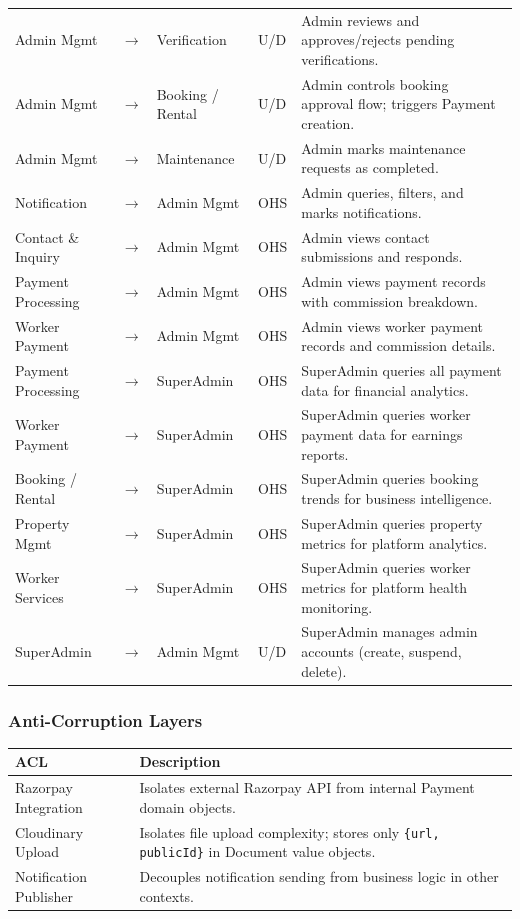 \documentclass[12pt,a4paper]{article}
\begin{document}
\begin{longtable}{@{}p{3.2cm}p{0.5cm}p{3.2cm}p{2.2cm}p{5.2cm}@{}}
Admin Mgmt & $\rightarrow$ & Verification & U/D & Admin reviews and approves/rejects pending verifications. \\[3pt]
Admin Mgmt & $\rightarrow$ & Booking / Rental & U/D & Admin controls booking approval flow; triggers Payment creation. \\[3pt]
Admin Mgmt & $\rightarrow$ & Maintenance & U/D & Admin marks maintenance requests as completed. \\[3pt]
Notification & $\rightarrow$ & Admin Mgmt & OHS & Admin queries, filters, and marks notifications. \\[3pt]
Contact \& Inquiry & $\rightarrow$ & Admin Mgmt & OHS & Admin views contact submissions and responds. \\[3pt]
Payment Processing & $\rightarrow$ & Admin Mgmt & OHS & Admin views payment records with commission breakdown. \\[3pt]
Worker Payment & $\rightarrow$ & Admin Mgmt & OHS & Admin views worker payment records and commission details. \\[3pt]
Payment Processing & $\rightarrow$ & SuperAdmin & OHS & SuperAdmin queries all payment data for financial analytics. \\[3pt]
Worker Payment & $\rightarrow$ & SuperAdmin & OHS & SuperAdmin queries worker payment data for earnings reports. \\[3pt]
Booking / Rental & $\rightarrow$ & SuperAdmin & OHS & SuperAdmin queries booking trends for business intelligence. \\[3pt]
Property Mgmt & $\rightarrow$ & SuperAdmin & OHS & SuperAdmin queries property metrics for platform analytics. \\[3pt]
Worker Services & $\rightarrow$ & SuperAdmin & OHS & SuperAdmin queries worker metrics for platform health monitoring. \\[3pt]
SuperAdmin & $\rightarrow$ & Admin Mgmt & U/D & SuperAdmin manages admin accounts (create, suspend, delete). \\[3pt]
\end{longtable}

\subsubsection*{Anti-Corruption Layers}

\begin{center}
\begin{tabular}{@{}p{4cm}p{10cm}@{}}
\toprule
\textbf{ACL} & \textbf{Description} \\
\midrule
Razorpay Integration & Isolates external Razorpay API from internal Payment domain objects. \\
Cloudinary Upload & Isolates file upload complexity; stores only \texttt{\{url, publicId\}} in Document value objects. \\
Notification Publisher & Decouples notification sending from business logic in other contexts. \\
\bottomrule
\end{tabular}
\end{center}
\end{document}
